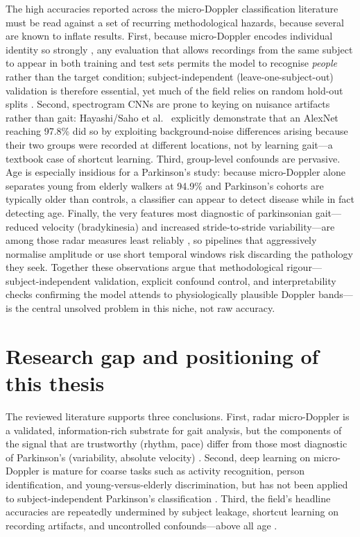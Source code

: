 The high accuracies reported across the micro-Doppler classification literature
must be read against a set of recurring methodological hazards, because several
are known to inflate results. First, because micro-Doppler encodes individual
identity so strongly \cite{papanastasiou2020,ni2020}, any evaluation that allows
recordings from the same subject to appear in both training and test sets
permits the model to recognise \emph{people} rather than the target condition;
subject-independent (leave-one-subject-out) validation is therefore essential,
yet much of the field relies on random hold-out splits
\cite{hayashi2021,hoshiga2021}. Second, spectrogram CNNs are prone to keying on
nuisance artifacts rather than gait: Hayashi/Saho et al.\ \cite{hayashi2021}
explicitly demonstrate that an AlexNet reaching 97.8\% did so by exploiting
background-noise differences arising because their two groups were recorded at
different locations, not by learning gait---a textbook case of shortcut
learning. Third, group-level confounds are pervasive. Age is especially
insidious for a Parkinson's study: because micro-Doppler alone separates young
from elderly walkers at 94.9\% \cite{hayashi2021} and Parkinson's cohorts are
typically older than controls, a classifier can appear to detect disease while
in fact detecting age. Finally, the very features most diagnostic of
parkinsonian gait---reduced velocity (bradykinesia) and increased stride-to-stride
variability---are among those radar measures least reliably \cite{gurbuz2024},
so pipelines that aggressively normalise amplitude or use short temporal windows
risk discarding the pathology they seek. Together these observations argue that
methodological rigour---subject-independent validation, explicit confound
control, and interpretability checks confirming the model attends to
physiologically plausible Doppler bands---is the central unsolved problem in this
niche, not raw accuracy.

\section{Research gap and positioning of this thesis}
\label{sec:gap}

The reviewed literature supports three conclusions. First, radar micro-Doppler
is a validated, information-rich substrate for gait analysis, but the components
of the signal that are trustworthy (rhythm, pace) differ from those most
diagnostic of Parkinson's (variability, absolute velocity)
\cite{seifert2020,gurbuz2024}. Second, deep learning on micro-Doppler is mature
for coarse tasks such as activity recognition, person identification, and
young-versus-elderly discrimination, but has not been applied to
subject-independent Parkinson's classification
\cite{hayashi2021,papanastasiou2020,ni2020,lopezdelgado2026}. Third, the
field's headline accuracies are repeatedly undermined by subject leakage,
shortcut learning on recording artifacts, and uncontrolled confounds---above all
age \cite{hayashi2021}.


